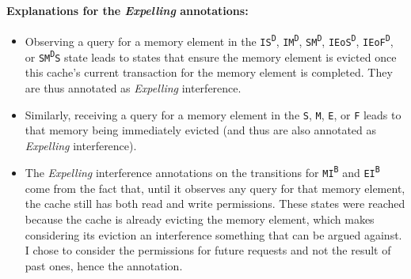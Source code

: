 \paragraph{Explanations for the \textit{Expelling} annotations:}
\begin{itemize}
\item
   Observing a \getmquery{} query for a memory element in the
   \texttt{IS\textsuperscript{D}}, \texttt{IM\textsuperscript{D}},
   \texttt{SM\textsuperscript{D}}, \texttt{IEoS\textsuperscript{D}},
   \texttt{IEoF\textsuperscript{D}}, or \texttt{SM\textsuperscript{D}S} state
   leads to states that ensure the memory element is evicted once this cache's
   current transaction for the memory element is completed. They are thus
   annotated as \textit{Expelling} interference.
\item
   Similarly, receiving a \getmquery{} query for a memory element in the
   \texttt{S}, \texttt{M}, \texttt{E}, or \texttt{F} leads to that memory being
   immediately evicted (and thus are also annotated as \textit{Expelling}
   interference).
\item
   The \textit{Expelling} interference annotations on the transitions for
   \texttt{MI\textsuperscript{B}} and \texttt{EI\textsuperscript{B}} come from
   the fact that, until it observes any query for that memory element, the cache
   still has both read and write permissions. These states were reached because
   the cache is already evicting the memory element, which makes considering its
   eviction an interference something that can be argued against. I chose to
   consider the permissions for future requests and not the result of past ones,
   hence the annotation.
\end{itemize}

